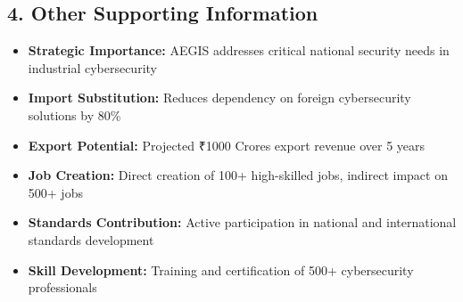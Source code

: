 \documentclass[12pt,a4paper]{article}
\begin{document}
\subsection*{4. Other Supporting Information}
\begin{itemize}
    \item \textbf{Strategic Importance:} AEGIS addresses critical national security needs in industrial cybersecurity
    \item \textbf{Import Substitution:} Reduces dependency on foreign cybersecurity solutions by 80\%
    \item \textbf{Export Potential:} Projected ₹1000 Crores export revenue over 5 years
    \item \textbf{Job Creation:} Direct creation of 100+ high-skilled jobs, indirect impact on 500+ jobs
    \item \textbf{Standards Contribution:} Active participation in national and international standards development
    \item \textbf{Skill Development:} Training and certification of 500+ cybersecurity professionals
\end{itemize}

\vspace{2cm}

\begin{center}
\end{center}
\end{document}
